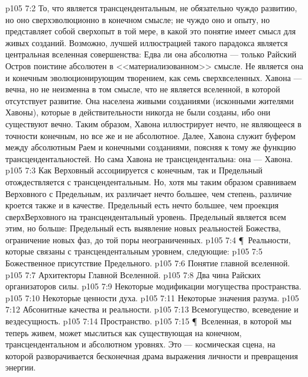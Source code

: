 \vs p105 7:2 То, что является трансцендентальным, не обязательно чуждо развитию, но оно сверхэволюционно в конечном смысле; не чуждо оно и опыту, но представляет собой сверхопыт в той мере, в какой это понятие имеет смысл для живых созданий. Возможно, лучшей иллюстрацией такого парадокса является центральная вселенная совершенства: Едва ли она абсолютна --- только Райский Остров поистине абсолютен в <<материализованном>> смысле. Не является она и конечным эволюционирующим творением, как семь сверхвселенных. Хавона --- вечна, но не неизменна в том смысле, что не является вселенной, в которой отсутствует развитие. Она населена живыми созданиями (исконными жителями Хавоны), которые в действительности никогда не были созданы, ибо они существуют вечно. Таким образом, Хавона иллюстрирует нечто, не являющееся в точности конечным, но все же и не абсолютное. Далее, Хавона служит буфером между абсолютным Раем и конечными созданиями, поясняя к тому же функцию трансцендентальностей. Но сама Хавона не трансцендентальна: она --- Хавона.
\vs p105 7:3 Как Верховный ассоциируется с конечным, так и Предельный отождествляется с трансцендентальным. Но, хотя мы таким образом сравниваем Верховного с Предельным, их различает нечто большее, чем степень, различие кроется также и в качестве. Предельный есть нечто большее, чем проекция сверхВерховного на трансцендентальный уровень. Предельный является всем этим, но больше: Предельный есть выявление новых реальностей Божества, ограничение новых фаз, до той поры неограниченных.
\vs p105 7:4 \P\ Реальности, которые связаны с трансцендентальным уровнем, следующие:
\vs p105 7:5 \bibnobreakspace Божественное присутствие Предельного.
\vs p105 7:6 \bibnobreakspace Понятие главной вселенной.
\vs p105 7:7 \bibnobreakspace Архитекторы Главной Вселенной.
\vs p105 7:8 \bibnobreakspace Два чина Райских организаторов силы.
\vs p105 7:9 \bibnobreakspace Некоторые модификации могущества пространства.
\vs p105 7:10 \bibnobreakspace Некоторые ценности духа.
\vs p105 7:11 \bibnobreakspace Некоторые значения разума.
\vs p105 7:12 \bibnobreakspace Абсонитные качества и реальности.
\vs p105 7:13 \bibnobreakspace Всемогущество, всеведение и вездесущность.
\vs p105 7:14 \bibnobreakspace Пространство.
\vs p105 7:15 \P\ Вселенная, в которой мы теперь живем, может мыслиться как существующая на конечном, трансцендентальном и абсолютном уровнях. Это --- космическая сцена, на которой разворачивается бесконечная драма выражения личности и превращения энергии.
